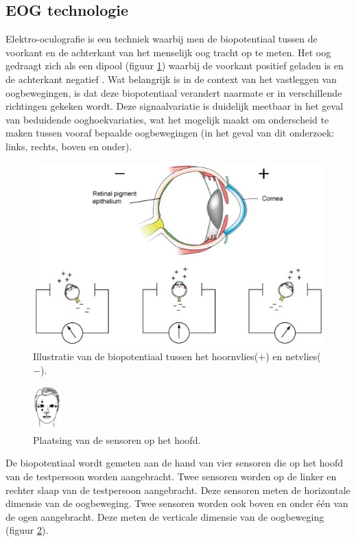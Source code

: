 \documentclass{article}
\begin{document}
\subsection{EOG technologie}
Elektro-oculografie is een techniek waarbij men de biopotentiaal tussen de voorkant en de achterkant van het menselijk oog tracht  op te meten.  Het oog gedraagt zich als een dipool (figuur \ref{fig:oogdipool}) waarbij de voorkant positief geladen is en de achterkant negatief \cite{yagi:eoginterface}. Wat belangrijk is in de context van het vastleggen van oogbewegingen, is dat deze biopotentiaal verandert naarmate er in verschillende richtingen gekeken wordt. Deze signaalvariatie is duidelijk meetbaar in het geval van beduidende ooghoekvariaties, wat het mogelijk maakt om onderscheid te maken tussen vooraf bepaalde oogbewegingen (in het geval van dit onderzoek: links, rechts, boven en onder).
\begin{figure}[H]
	\centering
	\includegraphics[width=0.8\linewidth]{images/oogdipool}
	\caption{Illustratie van de biopotentiaal tussen het hoornvlies($+$) en netvlies($-$).\protect\cite{kulEGO}}
	\label{fig:oogdipool}
\end{figure}
\begin{figure}
	\begin{center}
		\includegraphics[width=0.1\textwidth]{images/sensorplaatsing}
		\caption{Plaatsing van de sensoren op het hoofd.\protect\cite{Barea:eogmobility}}
		\label{fig:sensorplaatsing}
	\end{center}
\end{figure}
De biopotentiaal wordt gemeten aan de hand van vier sensoren die op het hoofd van de testpersoon worden aangebracht. Twee sensoren worden op de linker en rechter slaap van de testpersoon aangebracht. Deze sensoren meten de horizontale dimensie van de oogbeweging. Twee sensoren worden ook boven en onder \'e\'en van de ogen aangebracht. Deze meten de verticale dimensie van de oogbeweging (figuur \ref{fig:sensorplaatsing}).\\
\end{document}

